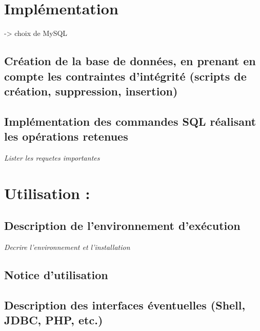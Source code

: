 \documentclass[12pt]{report}
\begin{document}
\section{Implémentation }
-> choix de MySQL

\subsection{Création de la base de données, en prenant en compte les contraintes d'intégrité (scripts de création, suppression, insertion)}

\subsection{Implémentation des commandes SQL réalisant les opérations retenues}

\emph{Lister les requetes importantes}

\section{Utilisation :}

\subsection{Description de l'environnement d'exécution}

\emph{Decrire l'environnement et l'installation}

\subsection{Notice d'utilisation}

\subsection{Description des interfaces éventuelles (Shell, JDBC, PHP, etc.)}
\end{document}

